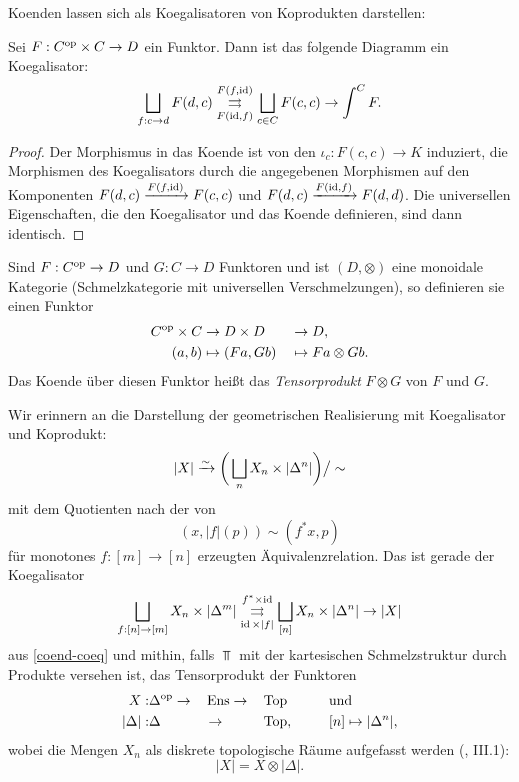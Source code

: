 Koenden lassen sich als Koegalisatoren von Koprodukten darstellen:
\begin{lemma} \label{coend-coeq}
  Sei $F: C^\mathrm{op} \times C \to D$ ein Funktor. Dann ist das folgende
  Diagramm ein Koegalisator:
  \[ \bigsqcup_{f: c \to d} F(d, c)
  \overset{F(f, \operatorname{id})}{\underset{F(\operatorname{id}, f)}{\rightrightarrows}}
  \bigsqcup_{c \in C} F(c, c) \to \int^C F. \]
\end{lemma}
\begin{proof}
  Der Morphismus in das Koende ist von den $\iota_c: F(c, c) \to K$
  induziert, die Morphismen des Koegalisators durch die angegebenen
  Morphismen auf den Komponenten $F(d, c) \xrightarrow{F(f, \operatorname{id})} F(c,
  c)$ und $F(d, c) \xrightarrow{F(\operatorname{id}, f)} F(d, d)$. Die universellen
  Eigenschaften, die den Koegalisator und das Koende definieren, sind
  dann identisch.
\end{proof}

Sind $F: C^\mathrm{op} \to D$ und $G: C \to D$ Funktoren und ist $(D, \otimes)$
eine monoidale Kategorie (Schmelzkategorie mit universellen
Verschmelzungen), so definieren sie einen Funktor
\begin{alignat*}{4}
  C^\mathrm{op} \times C &\to D \times D &&\to D, \\
  (a, b) &\mapsto (Fa, Gb) &&\mapsto Fa \otimes Gb.
\end{alignat*}
Das Koende über diesen Funktor heißt das \emph{Tensorprodukt} $F
\otimes G$ von $F$ und $G$.

Wir erinnern an die Darstellung der geometrischen Realisierung mit
Koegalisator und Koprodukt:
\[ |X| \xrightarrow[]{\sim} \bigg( \bigsqcup_n X_n \times |\Delta^n| \bigg) \big/ \sim \]
mit dem Quotienten nach der von
\[ (x, |f|(p)) \sim (f^* x, p) \]
für monotones $f: [m] \to [n]$ erzeugten Äquivalenzrelation. Das ist
gerade der Koegalisator
 \[ \bigsqcup_{f: [n] \to [m]} X_n \times |\Delta^m|
 \overset{f^* \times \operatorname{id}}{\underset{\operatorname{id} \times
     |f|}{\rightrightarrows}} \bigsqcup_{[n]} X_n \times |\Delta^n| \to
 |X| \] aus \ref{coend-coeq} und mithin, falls $\Top$ mit der
 kartesischen Schmelzstruktur durch Produkte versehen ist, das
 Tensorprodukt der Funktoren
\begin{alignat*}{4}
  X: &\Delta^\mathrm{op} \to &&\operatorname{Ens} \to &&\operatorname{Top} \qquad &&\text{und} \\
  |\Delta|: &\Delta &&\to &&\operatorname{Top}, && [n] \mapsto |\Delta^n|,
\end{alignat*}
wobei die Mengen $X_n$ als diskrete topologische Räume aufgefasst
werden (\cite{Moer}, III.1):
\[ |X| = X \otimes |\Delta|. \]

